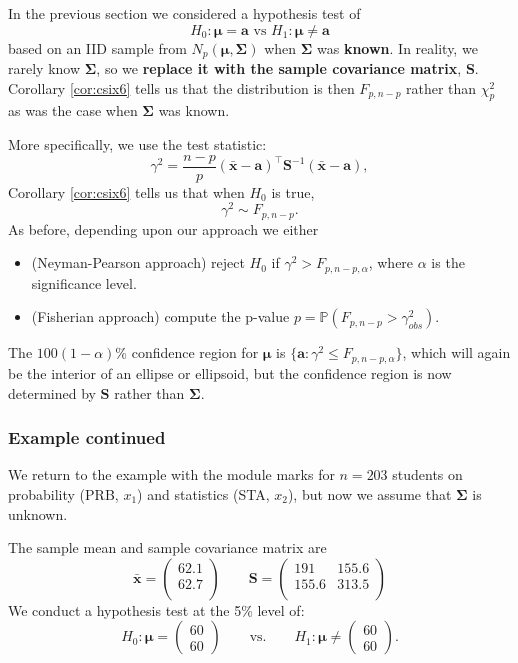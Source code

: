\documentclass[]{book}
\theoremstyle{definition}
\theoremstyle{definition}
\theoremstyle{definition}
\theoremstyle{remark}
\begin{document}
In the previous section we considered a hypothesis test of
\[H_0: {\boldsymbol{\mu}}= \mathbf a\mbox{ vs } H_1: {\boldsymbol{\mu}}\neq \mathbf a\] based on an IID sample from \(N_p({\boldsymbol{\mu}},\boldsymbol{\Sigma})\) when \(\boldsymbol{\Sigma}\) was \textbf{known}. In reality, we rarely know \(\boldsymbol{\Sigma}\), so we \textbf{replace it with the sample covariance matrix}, \(\mathbf S\). Corollary \ref{cor:csix6} tells us that the distribution is then \(F_{p,n-p}\) rather than \(\chi^2_p\) as was the case when \(\boldsymbol{\Sigma}\) was known.

More specifically, we use the test statistic:
\[\gamma^2 = \frac{n-p}{p} (\bar{\mathbf x}-\mathbf a)^\top \mathbf S^{-1} (\bar{\mathbf x}-\mathbf a),\]
Corollary \ref{cor:csix6} tells us that when \(H_0\) is true,
\[\gamma^2 \sim F_{p,n-p}.\]
As before, depending upon our approach we either

\begin{itemize}
\item
  (Neyman-Pearson approach) reject \(H_0\) if \(\gamma^2 > F_{p,n-p,\alpha}\), where \(\alpha\) is the significance level.
\item
  (Fisherian approach) compute the p-value \(p = \mathbb{P}(F_{p,n-p} > \gamma^2_{obs})\).
\end{itemize}

The \(100(1-\alpha)\)\% confidence region for \({\boldsymbol{\mu}}\) is \(\{ \mathbf a: \gamma^2 \leq F_{p,n-p,\alpha} \}\), which will again be the interior of an ellipse or ellipsoid, but the confidence region is now determined by \(\mathbf S\) rather than \(\boldsymbol{\Sigma}\).

\hypertarget{example-continued-1}{%
\subsubsection*{Example continued}\label{example-continued-1}}

We return to the example with the module marks for \(n=203\) students on probability (PRB, \(x_1\)) and statistics (STA, \(x_2\)), but now we assume that \(\boldsymbol{\Sigma}\) is unknown.

The sample mean and sample covariance matrix are
\[\bar{\mathbf x} = \begin{pmatrix}62.1 \\62.7 \\\end{pmatrix} \qquad \mathbf S= \begin{pmatrix}191&155.6 \\155.6&313.5 \\\end{pmatrix}\]
We conduct a hypothesis test at the 5\% level of:
\[H_0: {\boldsymbol{\mu}}= \begin{pmatrix} 60 \\ 60 \end{pmatrix} \qquad \text{vs.} \qquad H_1: {\boldsymbol{\mu}}\neq \begin{pmatrix} 60 \\ 60 \end{pmatrix}.\]
\end{document}
